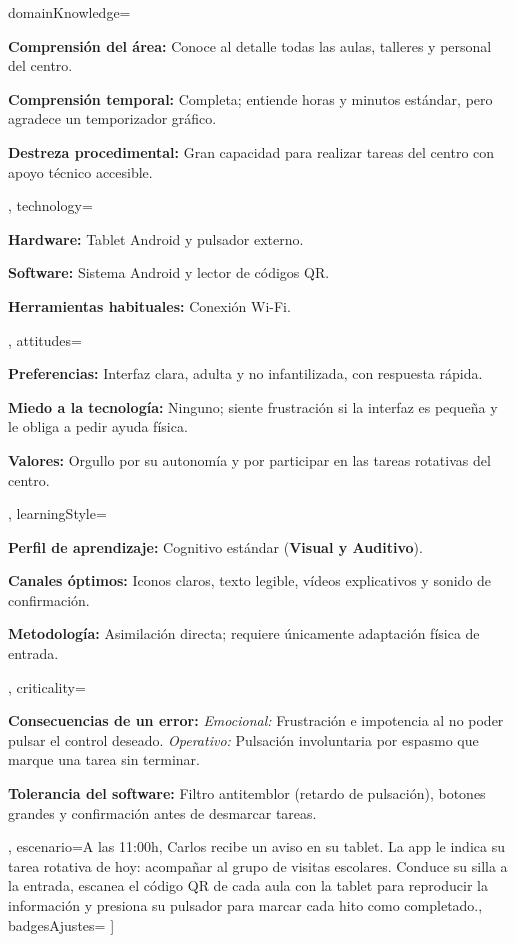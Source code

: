 \documentclass[10pt]{article}
\begin{document}
    domainKnowledge={%
        \item \textbf{Comprensión del área:} Conoce al detalle todas las aulas, talleres y personal del centro.
        \item \textbf{Comprensión temporal:} Completa; entiende horas y minutos estándar, pero agradece un temporizador gráfico.
        \item \textbf{Destreza procedimental:} Gran capacidad para realizar tareas del centro con apoyo técnico accesible.
    },
    technology={%
        \item \textbf{Hardware:} Tablet Android y pulsador externo.
        \item \textbf{Software:} Sistema Android y lector de códigos QR.
        \item \textbf{Herramientas habituales:} Conexión Wi-Fi.
    },
    attitudes={%
        \item \textbf{Preferencias:} Interfaz clara, adulta y no infantilizada, con respuesta rápida.
        \item \textbf{Miedo a la tecnología:} Ninguno; siente frustración si la interfaz es pequeña y le obliga a pedir ayuda física.
        \item \textbf{Valores:} Orgullo por su autonomía y por participar en las tareas rotativas del centro.
    },
    learningStyle={%
        \item \textbf{Perfil de aprendizaje:} Cognitivo estándar (\textbf{Visual y Auditivo}).
        \item \textbf{Canales óptimos:} Iconos claros, texto legible, vídeos explicativos y sonido de confirmación.
        \item \textbf{Metodología:} Asimilación directa; requiere únicamente adaptación física de entrada.
    },
    criticality={%
        \item \textbf{Consecuencias de un error:} \textit{Emocional:} Frustración e impotencia al no poder pulsar el control deseado. \textit{Operativo:} Pulsación involuntaria por espasmo que marque una tarea sin terminar.
        \item \textbf{Tolerancia del software:} Filtro antitemblor (retardo de pulsación), botones grandes y confirmación antes de desmarcar tareas.
    },
    escenario={A las 11:00h, Carlos recibe un aviso en su tablet. La app le indica su tarea rotativa de hoy: acompañar al grupo de visitas escolares. Conduce su silla a la entrada, escanea el código QR de cada aula con la tablet para reproducir la información y presiona su pulsador para marcar cada hito como completado.},
    badgesAjustes={%
         \hspace{2mm}
         \hspace{2mm}
         \hspace{2mm}
    }%
]
\end{document}
